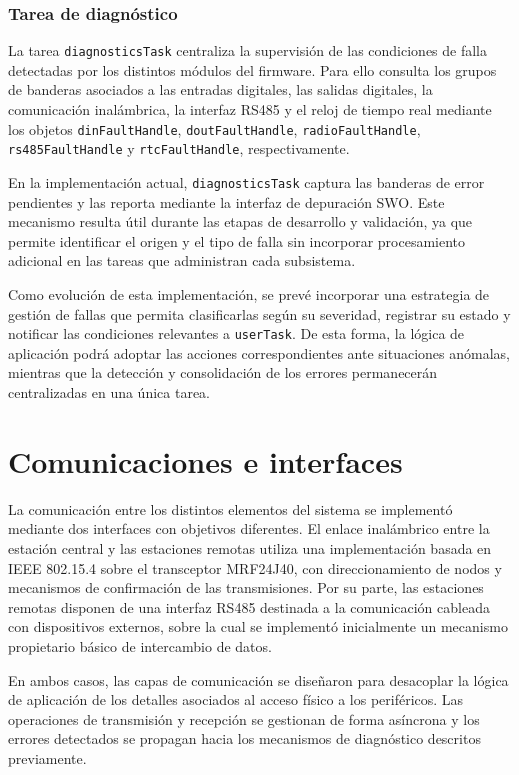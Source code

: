\subsubsection{Tarea de diagnóstico}

La tarea \texttt{diagnosticsTask} centraliza la supervisión de las condiciones de falla detectadas por los distintos módulos del firmware. Para ello consulta los grupos de banderas asociados a las entradas digitales, las salidas digitales, la comunicación inalámbrica, la interfaz RS485 y el reloj de tiempo real mediante los objetos \texttt{dinFaultHandle}, \texttt{doutFaultHandle}, \texttt{radioFaultHandle}, \texttt{rs485Fault\-Handle} y \texttt{rtcFaultHandle}, respectivamente.

En la implementación actual, \texttt{diagnosticsTask} captura las banderas de error pendientes y las reporta mediante la interfaz de depuración SWO. Este mecanismo resulta útil durante las etapas de desarrollo y validación, ya que permite identificar el origen y el tipo de falla sin incorporar procesamiento adicional en las tareas que administran cada subsistema.

Como evolución de esta implementación, se prevé incorporar una estrategia de gestión de fallas que permita clasificarlas según su severidad, registrar su estado y notificar las condiciones relevantes a \texttt{userTask}. De esta forma, la lógica de aplicación podrá adoptar las acciones correspondientes ante situaciones anómalas, mientras que la detección y consolidación de los errores permanecerán centralizadas en una única tarea.


\section{Comunicaciones e interfaces}

La comunicación entre los distintos elementos del sistema se implementó mediante dos interfaces con objetivos diferentes. El enlace inalámbrico entre la estación central y las estaciones remotas utiliza una implementación basada en IEEE 802.15.4 sobre el transceptor MRF24J40, con direccionamiento de nodos y mecanismos de confirmación de las transmisiones. Por su parte, las estaciones remotas disponen de una interfaz RS485 destinada a la comunicación cableada con dispositivos externos, sobre la cual se implementó inicialmente un mecanismo propietario básico de intercambio de datos.

En ambos casos, las capas de comunicación se diseñaron para desacoplar la lógica de aplicación de los detalles asociados al acceso físico a los periféricos. Las operaciones de transmisión y recepción se gestionan de forma asíncrona y los errores detectados se propagan hacia los mecanismos de diagnóstico descritos previamente.


